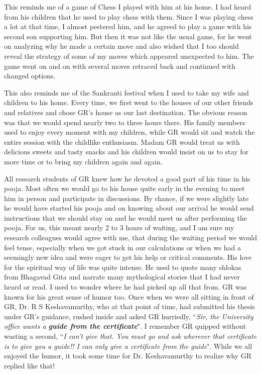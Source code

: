 This reminds me of a game of Chess I played with him at his home. I had heard from his children that he used to play chess with them. Since I was playing chess a lot at that time, I almost pestered him, and he agreed to play a game with his second son supporting him. But then it was not like the usual game, for he went on analyzing why he made a certain move and also wished that I too should reveal the strategy of some of my moves which appeared unexpected to him. The game went on and on with several moves retraced back and continued with changed options.

This also reminds me of the Sankranti festival when I used to take my wife and children to his home. Every time, we first went to the houses of our other friends and relatives and chose GR's house as our last destination. The obvious reason was that we would spend nearly two to three hours there. His family members used to enjoy every moment with my children, while GR would sit and watch the entire session with the childlike enthusiasm. Madam GR would treat us with delicious sweets and tasty snacks and his children would insist on us to stay for more time or to bring my children again and again.

All research students of GR knew how he devoted a good part of his time in his pooja. Most often we would go to his house quite early in the evening to meet him in person and participate in discussions. By chance, if we were slightly late he would have started his pooja and on knowing about our arrival he would send instructions that we should stay on and he would meet us after performing the pooja. For us, this meant nearly 2 to 3 hours of waiting, and I am sure my research colleagues would agree with me, that during the waiting period we would feel tense, especially when we got stuck in our calculations or when we had a seemingly new idea and were eager to get his help or critical comments. His love for the spiritual way of life was quite intense. He used to quote many shlokas from Bhagavad Gita and narrate many mythological stories that I had never heard or read. I used to wonder where he had picked up all that from. GR was known for his great sense of humor too. Once when we were all sitting in front of GR, Dr. R S Keshavamurthy, who at that point of time, had submitted his thesis under GR's guidance, rushed inside and asked GR hurriedly, ``\textit{Sir, the University office wants a \textbf{guide from the certificate}}". I remember GR quipped without wasting a second, ``\textit{I can't give that. You must go and ask wherever that certificate is to give you a guide!! I can only give a certificate from the guide}". While we all enjoyed the humor, it took some time for Dr. Keshavamurthy to realize why GR replied like that!

